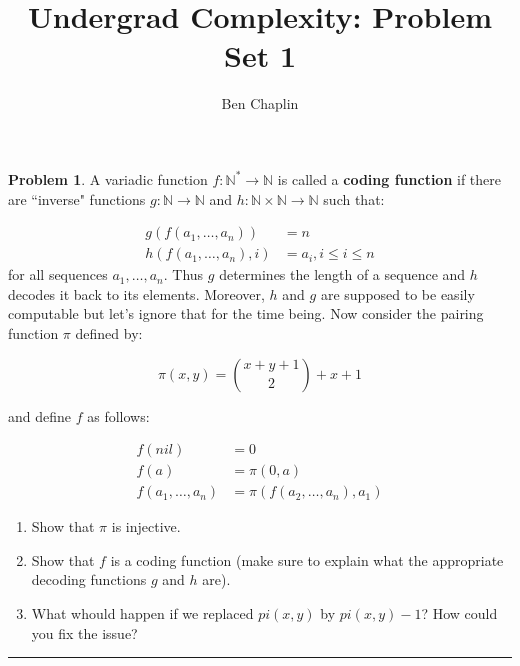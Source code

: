 \documentclass[11pt]{article}
\title{Undergrad Complexity: Problem Set 1}
\author{Ben Chaplin}
\date{}
\theoremstyle{plain}
\theoremstyle{definition}
\newtheorem{prob}{Problem}
\newcommand{\N}{\mathbb{N}}
\begin{document}
\maketitle

\begin{prob}
	A variadic function $f: \N^* \rightarrow \N$ is called a {\bf coding function} if there are ``inverse" functions
	$g: \N \rightarrow \N$ and $h: \N \times \N \rightarrow \N$ such that:

	\begin{align*}
		g(f(a_1, \ldots, a_n))    & = n                    \\
		h(f(a_1, \ldots, a_n), i) & = a_i, i \leq i \leq n
	\end{align*}
	for all sequences $a_1, \ldots, a_n$. Thus $g$ determines the length of a sequence and $h$ decodes it back to its elements.
	Moreover, $h$ and $g$ are supposed to be easily computable but let's ignore that for the time being. Now consider the pairing
	function $\pi$ defined by:

	$$\pi(x, y) = \binom{x + y + 1}{2} + x + 1$$

	and define $f$ as follows:

	\begin{align*}
		f(nil)              & = 0                             \\
		f(a)                & = \pi(0, a)                     \\
		f(a_1, \ldots, a_n) & = \pi(f(a_2, \ldots, a_n), a_1)
	\end{align*}

	\begin{enumerate}
		\item Show that $\pi$ is injective.
		\item Show that $f$ is a coding function (make sure to explain what the appropriate decoding functions $g$ and $h$ are).
		\item What whould happen if we replaced $pi(x, y)$ by $pi(x, y) -1$? How could you fix the issue?
	\end{enumerate}
\end{prob}

\noindent\rule{\textwidth}{0.5pt}
\end{document}
